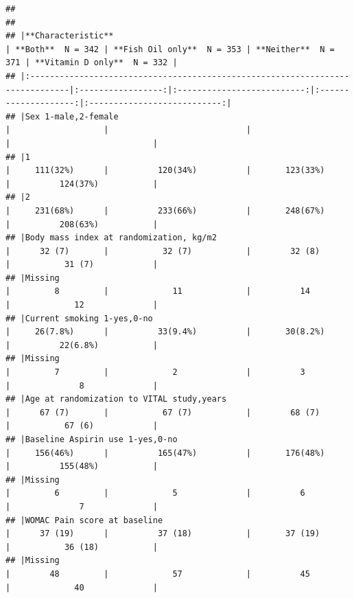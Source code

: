 \documentclass{article}
\begin{document}
\begin{verbatim}
## 
## 
## |**Characteristic**                                                             | **Both**  N = 342 | **Fish Oil only**  N = 353 | **Neither**  N = 371 | **Vitamin D only**  N = 332 |
## |:------------------------------------------------------------------------------|:-----------------:|:--------------------------:|:--------------------:|:---------------------------:|
## |Sex 1-male,2-female                                                            |                   |                            |                      |                             |
## |1                                                                              |     111(32%)      |          120(34%)          |       123(33%)       |          124(37%)           |
## |2                                                                              |     231(68%)      |          233(66%)          |       248(67%)       |          208(63%)           |
## |Body mass index at randomization, kg/m2                                        |      32 (7)       |           32 (7)           |        32 (8)        |           31 (7)            |
## |Missing                                                                        |         8         |             11             |          14          |             12              |
## |Current smoking 1-yes,0-no                                                     |     26(7.8%)      |          33(9.4%)          |       30(8.2%)       |          22(6.8%)           |
## |Missing                                                                        |         7         |             2              |          3           |              8              |
## |Age at randomization to VITAL study,years                                      |      67 (7)       |           67 (7)           |        68 (7)        |           67 (6)            |
## |Baseline Aspirin use 1-yes,0-no                                                |     156(46%)      |          165(47%)          |       176(48%)       |          155(48%)           |
## |Missing                                                                        |         6         |             5              |          6           |              7              |
## |WOMAC Pain score at baseline                                                   |      37 (19)      |          37 (18)           |       37 (19)        |           36 (18)           |
## |Missing                                                                        |        48         |             57             |          45          |             40              |

\end{verbatim}
\end{document}
